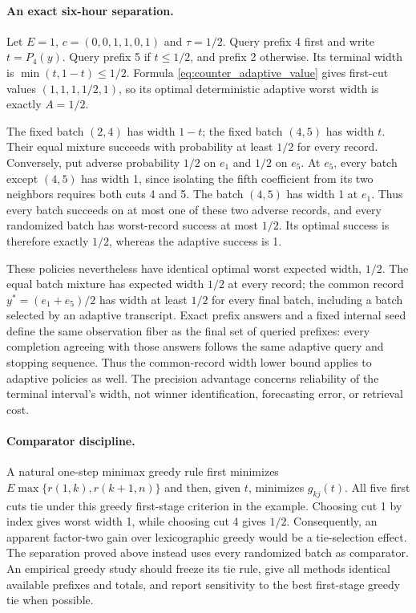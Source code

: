 \paragraph{An exact six-hour separation.}
Let $E=1$, $c=(0,0,1,1,0,1)$ and $\tau=1/2$.  Query prefix 4 first and write
$t=P_4(y)$.  Query prefix 5 if $t\leq1/2$, and prefix 2 otherwise.  Its
terminal width is $\min(t,1-t)\leq1/2$.  Formula
\eqref{eq:counter_adaptive_value} gives first-cut values
$(1,1,1,1/2,1)$, so its optimal deterministic adaptive worst width is exactly
$A=1/2$.

The fixed batch $(2,4)$ has width $1-t$; the fixed batch $(4,5)$ has width
$t$.  Their equal mixture succeeds with probability at least $1/2$ for
every record.  Conversely, put adverse probability $1/2$ on $e_1$ and
$1/2$ on $e_5$.  At $e_5$, every batch except $(4,5)$ has width 1, since
isolating the fifth coefficient from its two neighbors requires both cuts
4 and 5.  The batch $(4,5)$ has width 1 at $e_1$.  Thus every batch succeeds
on at most one of these two adverse records, and every randomized batch
has worst-record success at most $1/2$.  Its optimal success is therefore
exactly $1/2$, whereas the adaptive success is 1.

These policies nevertheless have identical optimal worst expected width,
$1/2$.  The equal batch mixture has expected width $1/2$ at every record;
the common record $y^*=(e_1+e_5)/2$ has width at least $1/2$ for every final
batch, including a batch selected by an adaptive transcript.  Exact
prefix answers and a fixed internal seed define the same observation fiber
as the final set of queried prefixes: every completion agreeing with those
answers follows the same adaptive query and stopping sequence.  Thus the
common-record width lower bound applies to adaptive policies as well.
The precision advantage concerns reliability of the terminal interval's
width, not winner identification, forecasting error, or retrieval cost.

\paragraph{Comparator discipline.}
A natural one-step minimax greedy rule first minimizes
$E\max\{r(1,k),r(k+1,n)\}$ and then, given $t$, minimizes
$g_{kj}(t)$.  All five first cuts tie under this greedy first-stage
criterion in the example.  Choosing cut 1 by index gives worst width 1,
while choosing cut 4 gives $1/2$.  Consequently, an apparent factor-two
gain over lexicographic greedy would be a tie-selection effect.  The
separation proved above instead uses every randomized batch as comparator.
An empirical greedy study should freeze its tie rule, give all methods
identical available prefixes and totals, and report sensitivity to the
best first-stage greedy tie when possible.
